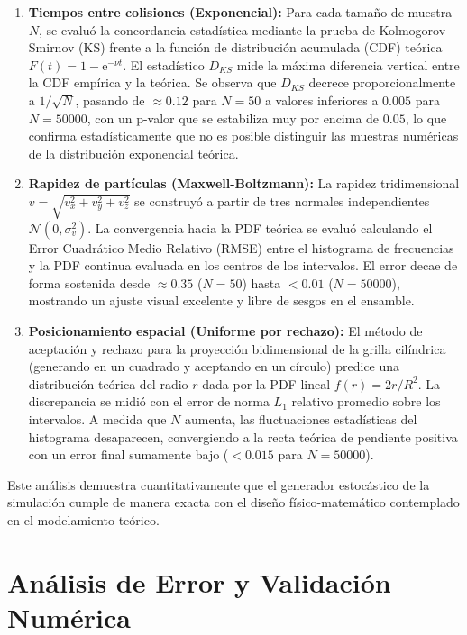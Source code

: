 \documentclass[11pt]{article}
\begin{document}
\begin{enumerate}
    \item \textbf{Tiempos entre colisiones (Exponencial):} 
    Para cada tamaño de muestra $N$, se evaluó la concordancia estadística mediante la prueba de Kolmogorov-Smirnov (KS) frente a la función de distribución acumulada (CDF) teórica $F(t) = 1 - \mathrm{e}^{-\nu t}$. El estadístico $D_{KS}$ mide la máxima diferencia vertical entre la CDF empírica y la teórica. Se observa que $D_{KS}$ decrece proporcionalmente a $1/\sqrt{N}$, pasando de $\approx 0.12$ para $N=50$ a valores inferiores a $0.005$ para $N=50000$, con un p-valor que se estabiliza muy por encima de $0.05$, lo que confirma estadísticamente que no es posible distinguir las muestras numéricas de la distribución exponencial teórica.
    
    \item \textbf{Rapidez de partículas (Maxwell-Boltzmann):} 
    La rapidez tridimensional $v = \sqrt{v_x^2 + v_y^2 + v_z^2}$ se construyó a partir de tres normales independientes $\mathcal{N}(0, \sigma_v^2)$. La convergencia hacia la PDF teórica se evaluó calculando el Error Cuadrático Medio Relativo (RMSE) entre el histograma de frecuencias y la PDF continua evaluada en los centros de los intervalos. El error decae de forma sostenida desde $\approx 0.35$ ($N=50$) hasta $< 0.01$ ($N=50000$), mostrando un ajuste visual excelente y libre de sesgos en el ensamble.
    
    \item \textbf{Posicionamiento espacial (Uniforme por rechazo):} 
    El método de aceptación y rechazo para la proyección bidimensional de la grilla cilíndrica (generando en un cuadrado y aceptando en un círculo) predice una distribución teórica del radio $r$ dada por la PDF lineal $f(r) = 2r/R^2$. La discrepancia se midió con el error de norma $L_1$ relativo promedio sobre los intervalos. A medida que $N$ aumenta, las fluctuaciones estadísticas del histograma desaparecen, convergiendo a la recta teórica de pendiente positiva con un error final sumamente bajo ($<0.015$ para $N=50000$).
\end{enumerate}

Este análisis demuestra cuantitativamente que el generador estocástico de la simulación cumple de manera exacta con el diseño físico-matemático contemplado en el modelamiento teórico.

\section{Análisis de Error y Validación Numérica}
\end{document}
